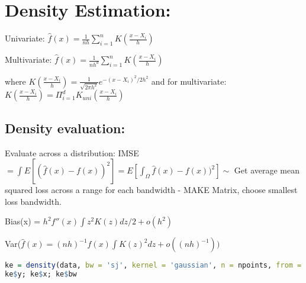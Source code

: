 \section*{Density Estimation:}

Univariate: $\hat{f}(x)=\frac{1}{nh}\sum^{n}_{i=1}K(\frac{x-X_i}{h})$

\noindent Multivariate: $\hat{f}(x) = \frac{1}{nh^d}\sum^{n}_{i=1}K(\frac{x-X_i}{h})$

\noindent where $K(\frac{x-X_i}{h}) = \frac{1}{\sqrt{2\pi h^2}}e^{-(x-X_i)^2/2h^2}$ and for multivariate: $K(\frac{x-X_i}{h}) = \Pi^d_{i=1}K_{uni}(\frac{x-X_i}{h}) $

\subsection*{Density evaluation:}

Evaluate across a distribution: IMSE $= \int E[(\hat{f}(x)-f(x))^2] = E[\int_\Omega \hat{f}(x)-f(x))^2] \sim$  Get average mean squared loss across a range for each bandwidth - MAKE Matrix, choose smallest loss bandwidth.

\noindent Bias(x) = $h^2f''(x)\int z^2 K(z) dz/2 + o(h^2)$

\noindent Var($\hat{f}(x) = (nh)^{-1} f(x) \int K(z)^2 dz + o((nh)^{-1}))$

\begin{lstlisting}[language = R]
ke = density(data, bw = 'sj', kernel = 'gaussian', n = npoints, from = -1, to = 5)
ke$y; ke$x; ke$bw
\end{lstlisting}